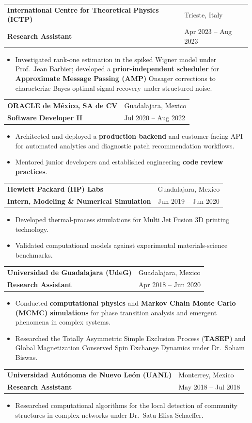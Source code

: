 \documentclass[10pt,a4paper]{article}
\makeatletter
\newenvironment{cvbullets}{
  \begin{itemize}[
        leftmargin=1.2em,
        label=\textcolor{accent}{\footnotesize\textbullet},
        itemsep=1.5pt,
        topsep=2pt,
        parsep=0pt,
        partopsep=0pt
      ]
    }{
  \end{itemize}
}
\newcommand{\cventry}[4]{%
  \vspace{2pt}%
  \begin{tabularx}{\textwidth}{@{}X>{\raggedleft\arraybackslash}p{1.55in}@{}}
    {\bfseries\color{ink}#1} & {\small\color{muted}#3}\\[-1pt]
    {\bfseries\color{accent}#2} & {\small\color{muted}#4}
  \end{tabularx}%
  \vspace{-1pt}%
}
\makeatother
\begin{document}
\cventry{International Centre for Theoretical Physics (ICTP)}
{Research Assistant}{Trieste, Italy}{Apr 2023 -- Aug 2023}
\begin{cvbullets}
\item Investigated rank-one estimation in the spiked Wigner model under
  Prof.\ Jean Barbier; developed a \textbf{prior-independent scheduler} for
  \textbf{Approximate Message Passing (AMP)} Onsager corrections to
  characterize Bayes-optimal signal recovery under structured noise.
\end{cvbullets}

\cventry{ORACLE de México, SA de CV}{Software Developer II}
{Guadalajara, Mexico}{Jul 2020 -- Aug 2022}
\begin{cvbullets}
\item Architected and deployed a \textbf{production backend} and
  customer-facing API for automated analytics and diagnostic patch
  recommendation workflows.
\item Mentored junior developers and established engineering \textbf{code
  review practices}.
\end{cvbullets}

\cventry{Hewlett Packard (HP) Labs}{Intern, Modeling \& Numerical Simulation}
{Guadalajara, Mexico}{Jun 2019 -- Jun 2020}
\begin{cvbullets}
\item Developed thermal-process simulations for Multi Jet Fusion 3D printing
  technology.
\item Validated computational models against experimental
  materials-science benchmarks.
\end{cvbullets}

\cventry{Universidad de Guadalajara (UdeG)}{Research Assistant}
{Guadalajara, Mexico}{Apr 2018 -- Jun 2020}
\begin{cvbullets}
\item Conducted \textbf{computational physics} and \textbf{Markov Chain Monte
  Carlo (MCMC) simulations} for phase transition analysis and emergent
  phenomena in complex systems.
\item Researched the Totally Asymmetric Simple Exclusion Process
  (\textbf{TASEP}) and Global Magnetization Conserved Spin Exchange Dynamics
  under Dr.\ Soham Biswas.
\end{cvbullets}

\cventry{Universidad Autónoma de Nuevo León (UANL)}{Research Assistant}
{Monterrey, Mexico}{May 2018 -- Jul 2018}
\begin{cvbullets}
\item Researched computational algorithms for the local detection of
  community structures in complex networks under Dr.\ Satu Elisa Schaeffer.
\end{cvbullets}
\end{document}
